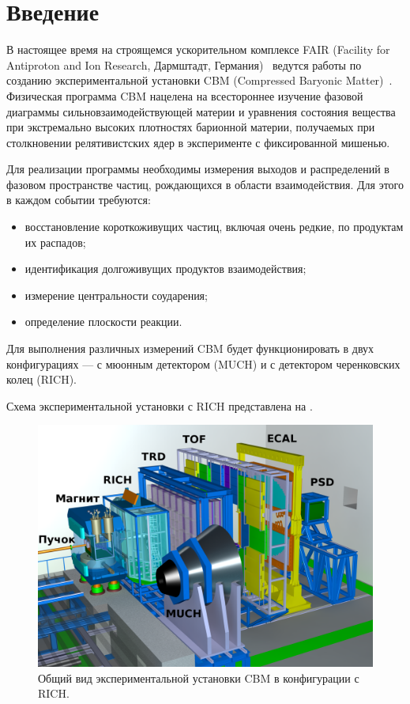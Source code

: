 \section*{Введение}\label{section:secIntro}

В настоящее время на строящемся ускорительном комплексе FAIR (Facility for Antiproton and Ion Research, Дармштадт, Германия)~\cite{FAIR} ведутся работы по созданию экспериментальной установки CBM (Compressed Baryonic Matter)~\cite{CBMBook, CBMSIS100, CBM_TSR, ProgressReport2014}. Физическая программа CBM нацелена на всестороннее изучение фазовой диаграммы сильновзаимодействующей материи и уравнения состояния вещества при экстремально высоких плотностях барионной материи, получаемых при столкновении релятивистских ядер в эксперименте с фиксированной мишенью.

Для реализации программы необходимы измерения выходов и распределений в фазовом пространстве частиц, рождающихся в области взаимодействия. Для этого в каждом событии требуются:
\begin{itemize}
\item {восстановление короткоживущих частиц, включая очень редкие, по продуктам их распадов;}
\item {идентификация долгоживущих продуктов взаимодействия;}
\item {измерение центральности соударения;}
\item {определение плоскости реакции.}
\end{itemize}

Для выполнения различных измерений CBM будет функционировать в двух конфигурациях --- с мюонным детектором (MUCH) и с детектором черенковских колец (RICH).

Схема экспериментальной установки с RICH представлена на .

\begin{figure}[H]
\centering
\includegraphics[width=1.0\textwidth]{pictures/1_CBM_SIS100_with_names.png}
\caption{Общий вид экспериментальной установки CBM в конфигурации с RICH.}
\label{fig:CBM}
\end{figure}

